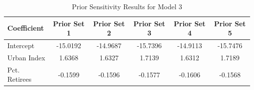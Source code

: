 \documentclass[12pt]{article}
\begin{document}
\begin{table}[h]
    \centering
    \begin{tabular}{l|ccccc}
        \hline
        Coefficient    & Prior Set 1 & Prior Set 2 & Prior Set 3 & Prior Set 4 & Prior Set 5 \\
        \hline
        Intercept      & -15.0192 & -14.9687 & -15.7396 & -14.9113 & -15.7476 \\
        Urban Index    & 1.6368 & 1.6327 & 1.7139 & 1.6312 & 1.7189 \\
        Pct. Retirees  & -0.1599 & -0.1596 & -0.1577 & -0.1606 & -0.1568 \\
        \hline
    \end{tabular}
    \caption{Prior Sensitivity Results for Model 3}
    \label{tab:Prior Sensitivity Results for Model 3}
\end{table}






\FloatBarrier
\newpage
\printbibliography
\end{document}
